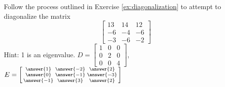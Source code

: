 \documentclass{ximera}
\begin{document}
\begin{exercise}
    Follow the process outlined in Exercise \ref{ex:diagonalization} to attempt to diagonalize the matrix
    \[ 
    \begin{bmatrix} 
    13 & 14 & 12 \\ 
    -6 & -4 & -6 \\ 
    -3 & -6 & -2 
    \end{bmatrix}
    \] 
    Hint: 1 is an eigenvalue. 
    $D = \left[\begin{smallmatrix} 1 & 0 & 0 \\ 0 & 2 & 0 \\ 0 & 0 & 4 \end{smallmatrix}\right]$, $E = \left[\begin{smallmatrix} \answer{1} & \answer{-2} & \answer{2} \\ \answer{0} & \answer{-1} & \answer{-3} \\\answer{-1} & \answer{3} & \answer{2} \end{smallmatrix}\right]$
\end{exercise}
\end{document}
